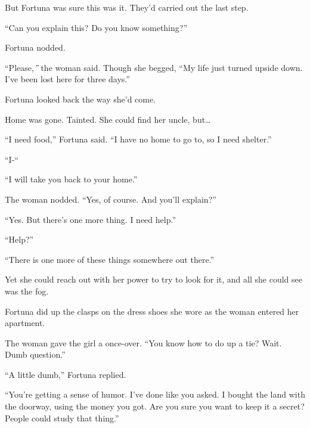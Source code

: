 But Fortuna was sure this was it.  They'd carried out the last step.



``Can you explain this?  Do you know something?''



Fortuna nodded.



``Please,\emph{'' }the woman said.  Though she begged,   ``My life just turned upside down.  I've been lost here for three days.''



Fortuna looked back the way she'd come.



Home was gone.  Tainted.  She could find her uncle, but\ldots



``I need food,'' Fortuna said.  ``I have no home to go to, so I need shelter.''



``I-``



``I will take you back to your home.''



The woman nodded.  ``Yes, of course.  And you'll explain?''



``Yes.  But there's one more thing.  I need help.''



``Help?''



``There is one more of these things somewhere out there.''



Yet she could reach out with her power to try to look for it, and all she could see was the fog.



\sectionbreak



Fortuna did up the clasps on the dress shoes she wore as the woman entered her apartment.



The woman gave the girl a once-over.  ``You know how to do up a tie?  Wait.  Dumb question.''



``A little dumb,'' Fortuna replied.



``You're getting a sense of humor.  I've done like you asked.  I bought the land with the doorway, using the money you got.  Are you sure you want to keep it a secret?  People could study that thing.''



